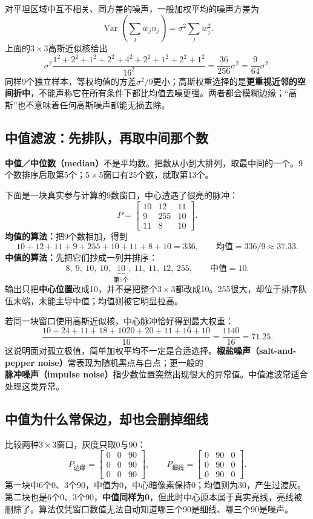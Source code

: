 对平坦区域中互不相关、同方差的噪声，一般加权平均的噪声方差为
\[
 \operatorname{Var}\!\left(\sum_j w_jn_j\right)=\sigma^2\sum_jw_j^2.
\]
上面的$3\times3$高斯近似核给出
\[
 \sigma^2\frac{1^2+2^2+1^2+2^2+4^2+2^2+1^2+2^2+1^2}{16^2}
 =\frac{36}{256}\sigma^2=\frac9{64}\sigma^2.
\]
同样9个独立样本，等权均值的方差$\sigma^2/9$更小；高斯权重选择的是\textbf{更重视近邻的空间折中}，不能声称它在所有条件下都比均值去噪更强。两者都会模糊边缘；“高斯”也不意味着任何高斯噪声都能无损去除。

\subsection{中值滤波：先排队，再取中间那个数}
\textbf{中值／中位数（median）}不是平均数。把数从小到大排列，取最中间的一个。9个数排序后取第5个；$5\times5$窗口有25个数，就取第13个。

下面是一块真实参与计算的9数窗口，中心遭遇了很亮的脉冲：
\[
 P=\begin{bmatrix}10&12&11\\9&255&10\\11&8&10\end{bmatrix}.
\]
\textbf{均值的算法：}把9个数相加，得到
\[
 10+12+11+9+255+10+11+8+10=336,
 \qquad\text{均值}=336/9\approx37.33.
\]
\textbf{中值的算法：}先把它们抄成一列并排序：
\[
 8,\ 9,\ 10,\ 10,\ \underbrace{10}_{\text{第5个}},\ 11,\ 11,\ 12,\ 255,
 \qquad\text{中值}=10.
\]
输出只把\textbf{中心位置}改成10，并不是把整个$3\times3$都改成10。255很大，却位于排序队伍末端，未能主导中值；均值则被它明显拉高。

若同一块窗口使用高斯近似核，中心脉冲恰好得到最大权重：
\[
 \frac{10+24+11+18+1020+20+11+16+10}{16}
 =\frac{1140}{16}=71.25.
\]
这说明面对孤立极值，简单加权平均不一定是合适选择。\textbf{椒盐噪声（salt-and-pepper noise）}常表现为随机黑点与白点；更一般的\textbf{脉冲噪声（impulse noise）}指少数位置突然出现很大的异常值。中值滤波常适合处理这类异常。

\subsection{中值为什么常保边，却也会删掉细线}
比较两种$3\times3$窗口，灰度只取0与90：
\[
 P_{\text{边缘}}=\begin{bmatrix}0&0&90\\0&0&90\\0&0&90\end{bmatrix},
 \qquad
 P_{\text{细线}}=\begin{bmatrix}0&90&0\\0&90&0\\0&90&0\end{bmatrix}.
\]
第一块中6个0、3个90，中值为0，中心暗像素保持0；均值则为30，产生过渡灰。第二块也是6个0、3个90，\textbf{中值同样为0}，但此时中心原本属于真实亮线，亮线被删除了。算法仅凭窗口数值无法自动知道哪三个90是细线、哪三个90是噪声。

